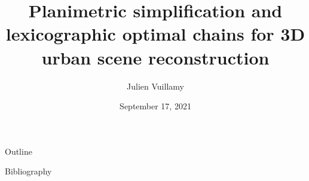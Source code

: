 \documentclass[
	handout,
]{beamer}
\title{Planimetric simplification and lexicographic optimal chains for 3D urban scene reconstruction}
\author[Julien Vuillamy]{Julien Vuillamy}
\institute[]{Dassault Systèmes Provence - INRIA Sophia Antipolis TITANE}
\date{September 17, 2021}
\newcommand\blfootnote[1]{%
	\begingroup
	\renewcommand\thefootnote{}\footnote{#1}%
	\addtocounter{footnote}{-1}%
	\endgroup
}
\begin{document}
	\begin{frame}
		\titlepage
	\end{frame}

	\begin{frame}{Outline}
		\tableofcontents[hideallsubsections]
	\end{frame}
	
	
	
	
	
		
	\appendix
	
	

\begin{frame}[allowframebreaks]{Bibliography}


\end{frame}

\end{document}
